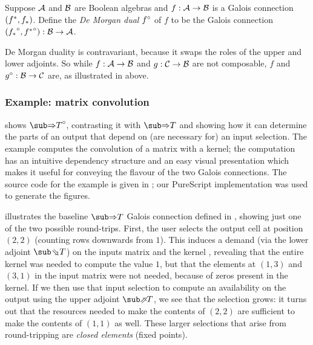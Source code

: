 \begin{definition}
   Suppose $\mathcal{A}$ and $\mathcal{B}$ are Boolean algebras and $f: \mathcal{A} \to \mathcal{B}$ is a Galois connection $({f}^*,{f}_*)$. Define the \emph{De Morgan dual} ${f}^{\circ}$ of $f$ to be the Galois connection $({{f}_*}^{\circ}, {{f}^*}^{\circ}): \mathcal{B} \to \mathcal{A}$.
\end{definition}

\noindent De Morgan duality is contravariant, because it swaps the roles of the upper and lower adjoints. So while $f: \mathcal{A} \to \mathcal{B}$ and $g: \mathcal{C} \to \mathcal{B}$ are not composable, $f$ and ${g}^{\circ}: \mathcal{B} \to \mathcal{C}$ are, as illustrated in  above.

\subsubsection{Example: matrix convolution}

 shows $\dual{\evalGC{T}}$, contrasting it with $\evalGC{T}$ and showing how it can determine the parts of an output that depend on (are necessary for) an input selection. The example computes the convolution of a matrix with a kernel; the computation has an intuitive dependency structure and an easy visual presentation which makes it useful for conveying the flavour of the two Galois connections. The source code for the example is given in ; our PureScript implementation was used to generate the figures.

 illustrates the baseline $\evalGC{T}$ Galois connection defined in , showing just one of the two possible round-trips. First, the user selects the output cell at position $(2,2)$ (counting rows downwards from $1$). This induces a demand (via the lower adjoint $\evalBwdF{T}$) on the inputs matrix  and the kernel , revealing that the entire kernel was needed to compute the value $1$, but that the elements at $(1,3)$ and $(3,1)$ in the input matrix were not needed, because of zeros present in the kernel. If we then use that input selection to  compute an availability on the output using the upper adjoint $\evalFwdF{T}$, we see that the selection grows: it turns out that the resources needed to make the contents of $(2,2)$ are sufficient to make the contents of $(1,1)$ as well. These larger selections that arise from round-tripping are \emph{closed elements} (fixed points).

